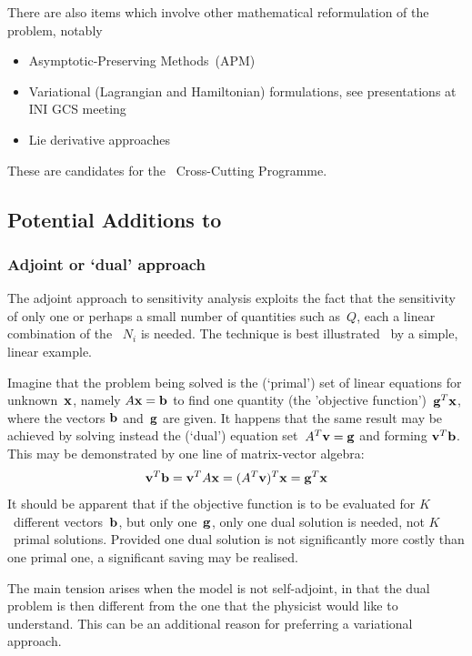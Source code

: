 There are also items which involve other mathematical reformulation of the problem, notably
\begin{itemize}
\item Asymptotic-Preserving Methods~(APM)~\cite{De17Asym}  %
\item Variational (Lagrangian and Hamiltonian) formulations, see presentations at INI GCS meeting
\item Lie derivative approaches~\cite{Ar19Chal-ppt}
\end{itemize}
These are candidates for the \exc \ Cross-Cutting Programme.


\subsection{Potential Additions to \nep }\label{sec:pot}

\subsubsection{Adjoint or `dual' approach}\label{sec:dual}
The adjoint approach to sensitivity analysis exploits the fact that
the sensitivity of only one or perhaps a small number of quantities
such as~$Q$, each a linear combination of the ~$N_i$ is needed.
The technique is best illustrated~\cite{Gi00Intr} by a simple, linear example.

Imagine that the problem being solved is the
(`primal') set of linear equations for unknown~${\bf x}$,
namely $A {\bf x}= {\bf b}$ to find one
quantity (the 'objective function')~${\bf g}^T {\bf x}$, where the
vectors ${\bf b}$ and~${\bf g}$ are given.
It happens that the same result may be achieved by solving instead
the (`dual') equation set~$A^T {\bf v}= {\bf g}$ and
forming ${\bf v}^T {\bf b}$.
This may be demonstrated by one line of matrix-vector algebra:
\begin{equation} \label{eq:dualequiv}
{\bf v}^T {\bf b} = {\bf v}^T A {\bf x} = (A^T {\bf v})^T {\bf x} = {\bf g}^T {\bf x}
\end{equation}
It should be apparent that if the objective function is to
be evaluated for $K$~different vectors~${\bf b}$, but only one~${\bf g}$,
only one dual solution is needed,  not $K$~primal solutions.
Provided one dual solution is not significantly more costly than one primal one, a
significant saving may be realised.

The main tension arises when the model is not self-adjoint, in that
the dual problem is then different from the one that the physicist would like to
understand. This can be an additional reason for preferring a variational approach.

